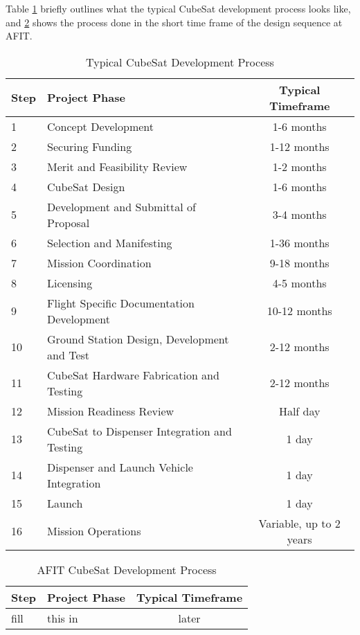 Table \ref{table:CubeSat Development Process} briefly outlines what the typical CubeSat development process looks like, and \ref{table:AFIT CubeSat Development Process} shows the process done in the short time frame of the design sequence at AFIT. 

\begin{table}[h!]
\centering
\begin{tabular}{|l|l|c|} 
 \hline
 Step & Project Phase & Typical Timeframe \\ [0.5ex] 
 \hline\hline
 1 & Concept Development & 1-6 months\\
 2 & Securing Funding & 1-12 months\\
 3 & Merit and Feasibility Review & 1-2 months\\
 4 & CubeSat Design & 1-6 months\\
 5 & Development and Submittal of Proposal & 3-4 months\\
 6 & Selection and Manifesting & 1-36 months\\
 7 & Mission Coordination & 9-18 months\\
 8 & Licensing & 4-5 months\\ 
 9 & Flight Specific Documentation Development & 10-12 months\\
 10 & Ground Station Design, Development and Test & 2-12 months\\ 
 11 & CubeSat Hardware Fabrication and Testing & 2-12 months\\
 12 & Mission Readiness Review & Half day\\
 13 & CubeSat to Dispenser Integration and Testing & 1 day\\
 14 & Dispenser and Launch Vehicle Integration & 1 day\\
 15 & Launch & 1 day\\
 16 & Mission Operations & Variable, up to 2 years\\
 \hline
\end{tabular}
\caption{Typical CubeSat Development Process}
\label{table:CubeSat Development Process}
\end{table}


\begin{table}[h!]
\centering
\begin{tabular}{|l|l|c|} 
 \hline
 Step & Project Phase & Typical Timeframe \\ [0.5ex] 
 \hline\hline
 fill & this in & later\\
 \hline
\end{tabular}
\caption{AFIT CubeSat Development Process}
\label{table:AFIT CubeSat Development Process}
\end{table}